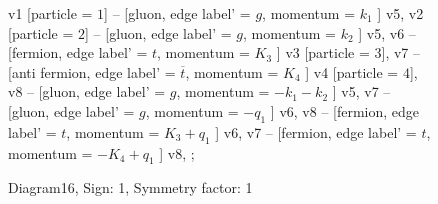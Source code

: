 \documentclass{revtex4}
\begin{document}
\begin{figure}[!htb]
\begin{center}
{    %
v1 [particle = \(1\)] -- [gluon, edge label' = \(g\), momentum = \(k_{1}\) ] v5, 
v2 [particle = \(2\)] -- [gluon, edge label' = \(g\), momentum = \(k_{2}\) ] v5, 
v6 -- [fermion, edge label' = \(t\), momentum = \(K_{3}\) ] v3 [particle = \(3\)], 
v7 -- [anti fermion, edge label' = \(\overline{t}\), momentum = \(K_{4}\) ] v4 [particle = \(4\)], 
v8 -- [gluon, edge label' = \(g\), momentum = \(-k_{1} - k_{2}\) ] v5, 
v7 -- [gluon, edge label' = \(g\), momentum = \(-q_{1}\) ] v6, 
v8 -- [fermion, edge label' = \(t\), momentum = \(K_{3} + q_{1}\) ] v6, 
v7 -- [fermion, edge label' = \(t\), momentum = \(-K_{4} + q_{1}\) ] v8, 
};
\end{center}
\caption{Diagram16, Sign: 1, Symmetry factor: 1}
\end{figure}
\newpage
\end{document}
